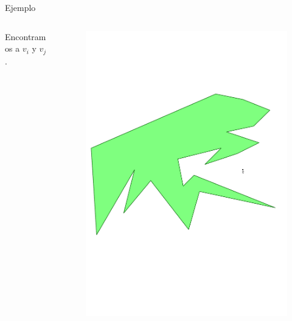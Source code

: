 \documentclass[aspectratio=169,xcolor=dvipsnames, t]{beamer}
\begin{document}
\begin{frame}{Ejemplo}
  \begin{columns}
    \begin{column}{0.3\textwidth}
      \raggedright %
      Encontramos a $v_{i}$ y $v_{j}$.
    \end{column}
    \begin{column}{0.7\textwidth}
      \vspace{-1.5cm} %
      \begin{figure}
        \centering
        \includegraphics[width=1\linewidth, height=.85\textheight, page=5, keepaspectratio]{IPE/point_visibility.pdf}
      \end{figure}
    \end{column}
  \end{columns}
\end{frame}
\end{document}
